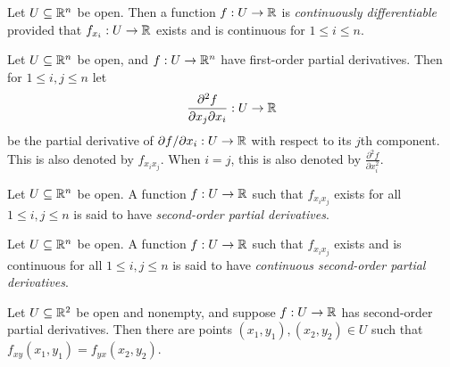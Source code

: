 \documentclass[letterpaper, twoside, 12pt]{book}
\begin{document}
\begin{definition}
  Let \(U\subseteq\mathbb R^n\) be open. Then a function
  \(f:U\to\mathbb R\) is \textit{continuously differentiable} provided that
  \(f_{x_i}:U\to\mathbb R\) exists and is continuous for \(1\leq i\leq n\).
\end{definition}

\begin{definition}
  Let \(U\subseteq\mathbb R^n\) be open, and \(f:U\to\mathbb R^n\) have first-order
  partial derivatives. Then for \(1\leq i,j\leq n\) let
  \[
    \frac{\partial^2 f}{\partial x_j\partial x_i}
      :
    U \to \mathbb R
  \]
  be the partial derivative of \(\partial f/\partial x_i:U\to\mathbb R\)
  with respect to its \(j\)th component. This is also denoted by
  \(f_{x_ix_j}\). When \(i=j\), this is also denoted by
  \(\frac{\partial^2 f}{\partial x_i^2}\).
\end{definition}

\begin{definition}
  Let \(U\subseteq\mathbb R^n\) be open. A function
  \(f:U\to\mathbb R\) such that \(f_{x_ix_j}\) exists for all
  \(1\leq i,j\leq n\) is said
  to have \textit{second-order partial derivatives}.
\end{definition}

\begin{definition}
  Let \(U\subseteq\mathbb R^n\) be open. A function
  \(f:U\to\mathbb R\) such that \(f_{x_ix_j}\) exists and is continuous for all
  \(1\leq i,j\leq n\) is said
  to have \textit{continuous second-order partial derivatives}.
\end{definition}

\begin{lemma}[13.11]
  Let \(U\subseteq \mathbb R^2\) be open and nonempty, and suppose
  \(f:U\to\mathbb R\) has second-order partial derivatives. Then there are
  points \((x_1,y_1),(x_2,y_2)\in U\) such that
  \(f_{xy}(x_1,y_1)=f_{yx}(x_2,y_2)\).
\end{lemma}
\end{document}
